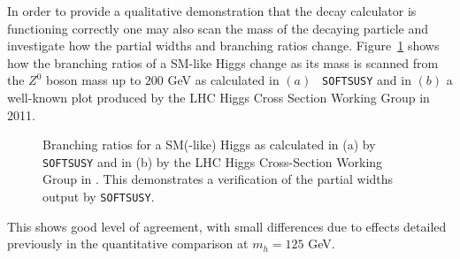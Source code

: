 \documentclass[final,3p,times]{elsarticle}
\begin{document}
In order to provide a qualitative demonstration that the decay calculator is
functioning correctly one may also scan the mass of the decaying particle and
investigate how the partial widths and branching ratios change. 
Figure~\ref{h0scancomp} shows how the branching ratios of a SM-like Higgs
change as its 
mass is scanned from the $Z^0$ boson mass up to $200$ GeV as calculated in
$(a)$ {\tt 
  SOFTSUSY} and in $(b)$ a well-known plot produced by the LHC Higgs Cross
Section Working Group \cite{Denner:2011} in 2011. 
\begin{figure}
  \centering
  \hfill
  \caption{Branching ratios for a SM(-like) Higgs as calculated in (a) by {\tt SOFTSUSY} and in (b) by the LHC Higgs Cross-Section Working Group in \cite{Denner:2011}. This demonstrates a verification of the partial widths output by {\tt SOFTSUSY}.} \label{h0scancomp}
\end{figure} 
This shows good level of agreement, with small differences due to effects
detailed previously in the quantitative comparison at $m_h = 125$ GeV. 
\end{document}
